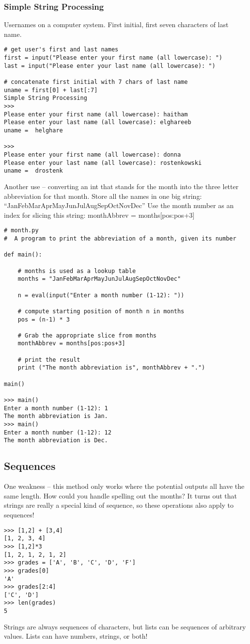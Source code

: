\documentclass[12pt,a4paper,final,twoside,onecolumn,titlepage]{book}
\begin{document}
\subsubsection{Simple String Processing}
Usernames on a computer system. First initial, first seven characters of last name.
\begin{lstlisting}
# get user's first and last names
first = input("Please enter your first name (all lowercase): ")
last = input("Please enter your last name (all lowercase): ")

# concatenate first initial with 7 chars of last name
uname = first[0] + last[:7]
Simple String Processing
>>> 
Please enter your first name (all lowercase): haitham
Please enter your last name (all lowercase): elghareeb
uname =  helghare

>>> 
Please enter your first name (all lowercase): donna
Please enter your last name (all lowercase): rostenkowski
uname =  drostenk
\end{lstlisting}
Another use – converting an int that stands for the month into the three letter abbreviation for that month. Store all the names in one big string:
“JanFebMarAprMayJunJulAugSepOctNovDec”
Use the month number as an index for slicing this string:
monthAbbrev = months[pos:pos+3]
\begin{lstlisting}
# month.py
#  A program to print the abbreviation of a month, given its number

def main():
    
    # months is used as a lookup table
    months = "JanFebMarAprMayJunJulAugSepOctNovDec"

    n = eval(input("Enter a month number (1-12): "))

    # compute starting position of month n in months
    pos = (n-1) * 3
    
    # Grab the appropriate slice from months
    monthAbbrev = months[pos:pos+3]

    # print the result    
    print ("The month abbreviation is", monthAbbrev + ".")

main()

>>> main()
Enter a month number (1-12): 1
The month abbreviation is Jan.
>>> main()
Enter a month number (1-12): 12
The month abbreviation is Dec.
\end{lstlisting}

\subsection{Sequences}
One weakness – this method only works where the potential outputs all have the same length. How could you handle spelling out the months? It turns out that strings are really a special kind of sequence, so these operations also apply to sequences!
\begin{lstlisting}
>>> [1,2] + [3,4]
[1, 2, 3, 4]
>>> [1,2]*3
[1, 2, 1, 2, 1, 2]
>>> grades = ['A', 'B', 'C', 'D', 'F']
>>> grades[0]
'A'
>>> grades[2:4]
['C', 'D']
>>> len(grades)
5
\end{lstlisting}
Strings are always sequences of characters, but lists can be sequences of arbitrary values. Lists can have numbers, strings, or both!
\end{document}
